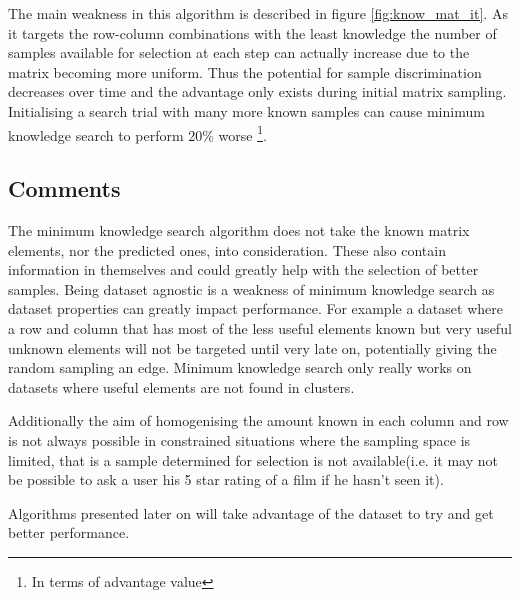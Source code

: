 The main weakness in this algorithm is described in figure \ref{fig:know_mat_it}. As it targets the row-column combinations with the least knowledge the number of samples available for selection at each step can actually increase due to the matrix becoming more uniform. Thus the potential for sample discrimination decreases over time and the advantage only exists during initial matrix sampling. Initialising a search trial with many more known samples can cause minimum knowledge search to perform 20\% worse \footnote{In terms of advantage value}.

\subsection{Comments}
The minimum knowledge search algorithm does not take the known matrix elements, nor the predicted ones, into consideration. These also contain information in themselves and could greatly help with the selection of better samples. Being dataset agnostic is a weakness of minimum knowledge search as dataset properties can greatly impact performance. For example a dataset where a row and column that has most of the less useful elements known but very useful unknown elements will not be targeted until very late on, potentially giving the random sampling an edge. Minimum knowledge search only really works on datasets where useful elements are not found in clusters.

Additionally the aim of homogenising the amount known in each column and row is not always possible in constrained situations where the sampling space is limited, that is a sample determined for selection is not available(i.e. it may not be possible to ask a user his 5 star rating of a film if he hasn't seen it).

Algorithms presented later on will take advantage of the dataset to try and get better performance.


